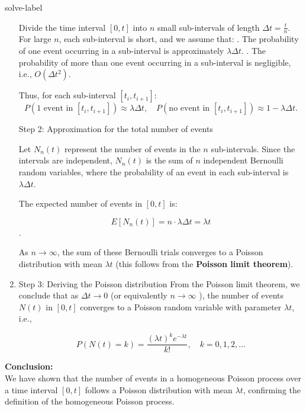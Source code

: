 \begin{solve}{}{solve-label}
\begin{enumerate}
			Divide the time interval $[0, t]$ into $n$ small sub-intervals of length  $\Delta t = \frac{t}{n}$. For large $n$, each sub-interval is short, and we assume that:
			. The probability of one event occurring in a sub-interval is approximately $\lambda \Delta t$.
			. The probability of more than one event occurring in a sub-interval is negligible, i.e., $O(\Delta t^2)$.
			
			Thus, for each sub-interval $[t_i, t_{i+1}]$:
			$$P(\text{1 event in } [t_i, t_{i+1}]) \approx \lambda \Delta t, \quad P(\text{no event in } [t_i, t_{i+1}]) \approx 1 - \lambda \Delta t.$$
			
			\subitem Step 2: Approximation for the total number of events
			
			Let $N_n(t)$ represent the number of events in the $n$ sub-intervals. Since the intervals are independent, $N_n(t)$ is the sum of $n$ independent Bernoulli random variables, where the probability of an event in each sub-interval is $\lambda \Delta t$.
			
			The expected number of events in $[0, t]$ is:
			
			$$E[N_n(t)] = n \cdot \lambda \Delta t = \lambda t$$.
			
			
			As $n \to \infty$, the sum of these Bernoulli trials converges to a Poisson distribution with mean $\lambda t$ (this follows from the \textbf{Poisson limit theorem}).
			
			\item Step 3: Deriving the Poisson distribution
			From the Poisson limit theorem, we conclude that as $\Delta t \to 0$  (or equivalently $n \to \infty$ ), the number of events $N(t)$ in $[0, t]$ converges to a Poisson random variable with parameter $\lambda t$, i.e.,
			
			$$P(N(t) = k) = \frac{(\lambda t)^k e^{-\lambda t}}{k!}, \quad k = 0, 1, 2, \dots$$
			
		\end{enumerate}
		\textbf{Conclusion:}\\
		We have shown that the number of events in a homogeneous Poisson process over a time interval $[0, t]$ follows a Poisson distribution with mean $\lambda t$, confirming the definition of the homogeneous Poisson process.
	\end{solve}
	
	
	
	
	
